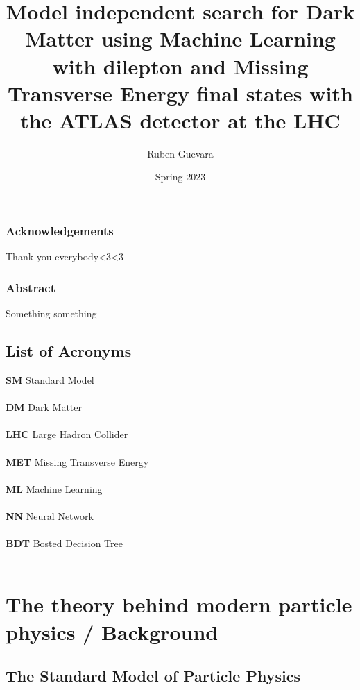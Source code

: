 \documentclass[14pt, a4paper]{book}
\title{Model independent search for Dark Matter using Machine Learning 
with dilepton and Missing Transverse Energy final states with the ATLAS detector at the LHC 
}
\author{Ruben Guevara}
\date{Spring 2023}
\begin{document}


\uiomasterfp[
colour = pink,
dept = {Department of Physics},
long,
program = {Physics: Nuclear and Particle Physics},
supervisors = {Professor Farid Ould-Saada \and Dr. Eirik Gramstad}
]
\newpage
\section*{Acknowledgements}
Thank you everybody<3<3

\newpage
\begin{center}
\section*{Abstract}
Something something
\end{center}


\newpage
\tableofcontents
\listoffigures
\listoftables

\chapter*{List of Acronyms}
\textbf{SM} Standard Model\\\\
\textbf{DM} Dark Matter\\\\
\textbf{LHC} Large Hadron Collider\\\\
\textbf{MET} Missing Transverse Energy\\\\
\textbf{ML} Machine Learning\\\\
\textbf{NN} Neural Network\\\\
\textbf{BDT} Bosted Decision Tree\\\\
\newpage
{}



\part{The theory behind modern particle physics / Background}


\chapter{The Standard Model of Particle Physics}\label{chap:SM}

\end{document}

